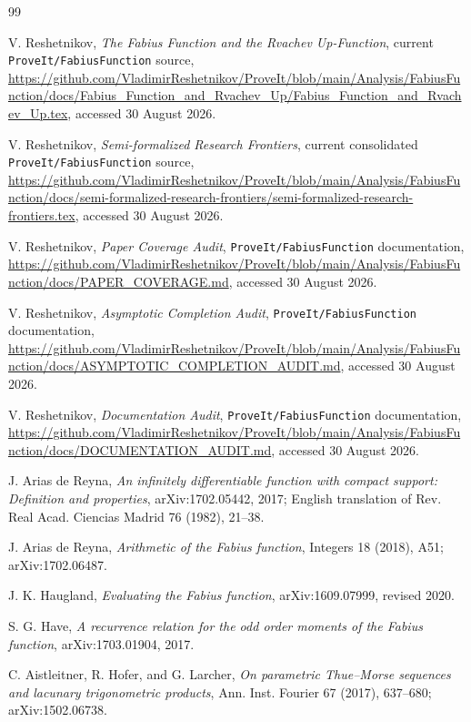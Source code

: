 \documentclass[11pt]{article}
\theoremstyle{definition}
\theoremstyle{remark}
\newcommand{\repo}{\texttt{ProveIt/FabiusFunction}}
\begin{document}
\begin{thebibliography}{99}

V. Reshetnikov,
\emph{The Fabius Function and the Rvachev Up-Function},
current \repo{} source,
\url{https://github.com/VladimirReshetnikov/ProveIt/blob/main/Analysis/FabiusFunction/docs/Fabius_Function_and_Rvachev_Up/Fabius_Function_and_Rvachev_Up.tex},
accessed 30 August 2026.

V. Reshetnikov,
\emph{Semi-formalized Research Frontiers},
current consolidated \repo{} source,
\url{https://github.com/VladimirReshetnikov/ProveIt/blob/main/Analysis/FabiusFunction/docs/semi-formalized-research-frontiers/semi-formalized-research-frontiers.tex},
accessed 30 August 2026.

V. Reshetnikov,
\emph{Paper Coverage Audit},
\repo{} documentation,
\url{https://github.com/VladimirReshetnikov/ProveIt/blob/main/Analysis/FabiusFunction/docs/PAPER_COVERAGE.md},
accessed 30 August 2026.

V. Reshetnikov,
\emph{Asymptotic Completion Audit},
\repo{} documentation,
\url{https://github.com/VladimirReshetnikov/ProveIt/blob/main/Analysis/FabiusFunction/docs/ASYMPTOTIC_COMPLETION_AUDIT.md},
accessed 30 August 2026.

V. Reshetnikov,
\emph{Documentation Audit},
\repo{} documentation,
\url{https://github.com/VladimirReshetnikov/ProveIt/blob/main/Analysis/FabiusFunction/docs/DOCUMENTATION_AUDIT.md},
accessed 30 August 2026.

J. Arias de Reyna,
\emph{An infinitely differentiable function with compact support: Definition and properties},
arXiv:1702.05442, 2017; English translation of Rev. Real Acad. Ciencias Madrid 76 (1982), 21--38.

J. Arias de Reyna,
\emph{Arithmetic of the Fabius function},
Integers 18 (2018), A51; arXiv:1702.06487.

J. K. Haugland,
\emph{Evaluating the Fabius function},
arXiv:1609.07999, revised 2020.

S. G. Have,
\emph{A recurrence relation for the odd order moments of the Fabius function},
arXiv:1703.01904, 2017.

C. Aistleitner, R. Hofer, and G. Larcher,
\emph{On parametric Thue--Morse sequences and lacunary trigonometric products},
Ann. Inst. Fourier 67 (2017), 637--680; arXiv:1502.06738.


\end{thebibliography}
\end{document}
